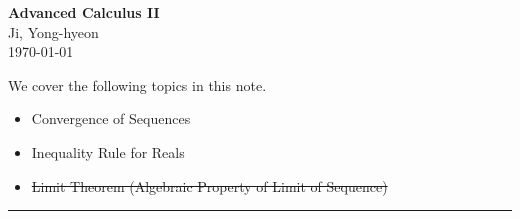 \documentclass[11pt,openany]{article}
\begin{document}
\begin{center}
	\huge\textbf{Advanced Calculus II}\\
	\vspace{0.5em}
	\large{Ji, Yong-hyeon}\\
	\vspace{0.5em}
	\normalsize{\today}\\
\end{center}

\noindent 
We cover the following topics in this note.
\begin{itemize}
	\item Convergence of Sequences
	\item Inequality Rule for Reals
	\item \st{Limit Theorem (Algebraic Property of Limit of Sequence)}
\end{itemize}
\hrule\vspace{12pt}
\end{document}
